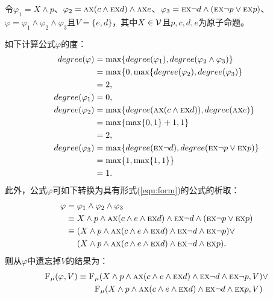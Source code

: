 \begin{example}
	\label{exp:x-class}
	令$\varphi_1 = X \wedge p$、$\varphi_2 = \textsc{a}\textsc{x}(c \wedge \textsc{e}\textsc{x} d) \wedge \textsc{a}\textsc{x} e$、$\varphi_3 = \textsc{e}\textsc{x} \neg d \wedge (\textsc{e}\textsc{x} \neg p \vee \textsc{e}\textsc{x} p)$、$\varphi = \varphi_1 \wedge \varphi_2 \wedge \varphi_3$且$V = \{e,d\}$，其中$X \in {\cal V}$且$p, c, d, e$为原子命题。
	
	如下计算公式$\varphi$的度：
	\begin{align*}
		degree(\varphi) &  =  \max\{degree(\varphi_1), degree(\varphi_2 \wedge \varphi_3)\}\\
		& = \max\{0, \max\{degree(\varphi_2), degree(\varphi_3)\}\\
		& = 2,\\
		degree(\varphi_1) & = 0,\\
		degree(\varphi_2) & = \max\{degree(\textsc{a}\textsc{x}(c \wedge \textsc{e}\textsc{x} d)), degree(\textsc{a}\textsc{x} e)\}\\
		& =\max\{\max\{0, 1\} + 1, 1\}\\
		& = 2,\\
		degree(\varphi_3) & = \max\{degree(\textsc{e}\textsc{x} \neg d), degree(\textsc{e}\textsc{x} \neg p \vee \textsc{e}\textsc{x} p)\}\\
		& = \max\{1, \max\{1,1\}\}\\
		& = 1.
	\end{align*}
	此外，公式$\varphi$可如下转换为具有形式(\ref{equ:form})的公式的析取：
	\begin{align*}
		\varphi & = \varphi_1 \wedge \varphi_2 \wedge \varphi_3\\
		& \equiv X \wedge p \wedge \textsc{a}\textsc{x}(c \wedge e \wedge \textsc{e}\textsc{x} d) \wedge \textsc{e}\textsc{x} \neg d \wedge (\textsc{e}\textsc{x} \neg p \vee \textsc{e}\textsc{x} p)\\
		& \equiv (X \wedge p \wedge \textsc{a}\textsc{x}(c \wedge e \wedge \textsc{e}\textsc{x} d) \wedge \textsc{e}\textsc{x} \neg d \wedge \textsc{e}\textsc{x} \neg p) \vee\\
		& \quad\ (X \wedge p \wedge \textsc{a}\textsc{x}(c \wedge e \wedge \textsc{e}\textsc{x} d) \wedge \textsc{e}\textsc{x} \neg d \wedge \textsc{e}\textsc{x}  p).
	\end{align*}
	则从$\varphi$中遗忘掉$V$的结果为：
	\begin{align*}
		\Muforget(\varphi,V) & \equiv \Muforget(X \wedge p \wedge \ALL\NEXT(c \wedge e \wedge \EXIST\NEXT d) \wedge \EXIST\NEXT \neg d \wedge \EXIST\NEXT \neg p, V) \vee \\
		& \qquad \Muforget(X \wedge p \wedge \ALL\NEXT(c \wedge e \wedge \EXIST\NEXT d) \wedge \EXIST\NEXT \neg d \wedge \EXIST\NEXT  p,V) \\

\end{align*}
\end{example}

